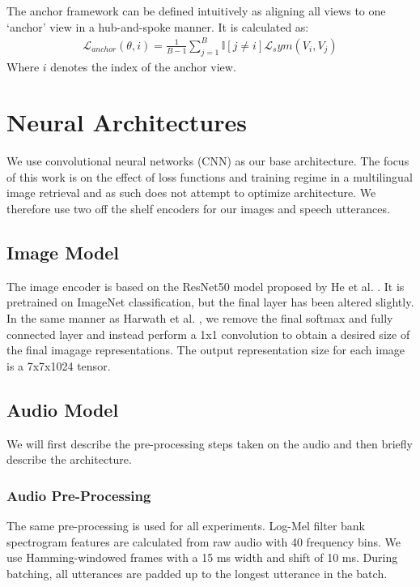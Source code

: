 The anchor framework can be defined intuitively as aligning all views to one `anchor' view in a hub-and-spoke manner.
It is calculated as:
\begin{align*}
    \mathcal{L}_{anchor}(\theta, i) = \frac{1}{B-1}\sum_{j=1}^{B} \mathbb{I}[j\neq i] \mathcal{L}_sym(V_i, V_j)
\end{align*}
Where $i$ denotes the index of the anchor view.
\section{Neural Architectures}
\label{background:model_architectures}
We use convolutional neural networks (CNN) as our base architecture. 
The focus of this work is on the effect of loss functions and training regime in a multilingual image retrieval and as such does not attempt to optimize architecture.
We therefore use two off the shelf encoders for our images and speech utterances.
\subsection{Image Model}
The image encoder is based on the ResNet50 model proposed by He et al. \cite{he2016deep}.
It is pretrained on ImageNet classification, but the final layer has been altered slightly.
In the same manner as Harwath et al. \cite{harwath2019learning}, we remove the final softmax and fully connected layer and instead perform a 1x1 convolution to obtain a desired size of the final imagage representations.
The output representation size for each image is a 7x7x1024 tensor.
\subsection{Audio Model}
\label{chapter:background|section:audio_model}
We will first describe the pre-processing steps taken on the audio and then briefly describe the architecture.
\subsubsection{Audio Pre-Processing}
The same pre-processing is used for all experiments.
Log-Mel filter bank spectrogram features are calculated from raw audio with 40 frequency bins.
We use Hamming-windowed frames with a 15 ms width and shift of 10 ms.
During batching, all utterances are padded up to the longest utterance in the batch.
